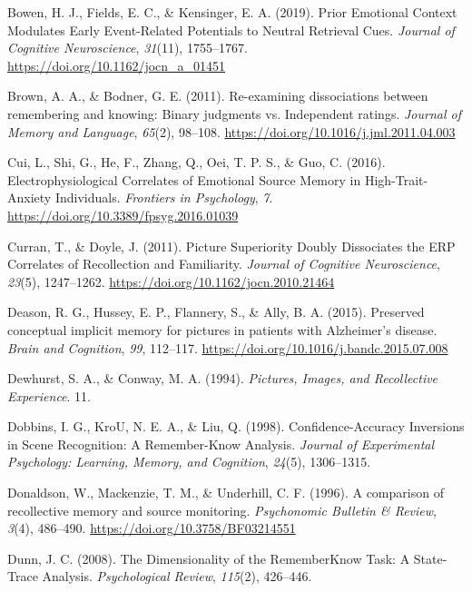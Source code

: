 \documentclass[
  11pt,
]{article}
\begin{document}
\leavevmode\hypertarget{ref-bowen2019}{}%
Bowen, H. J., Fields, E. C., \& Kensinger, E. A. (2019). Prior Emotional
Context Modulates Early Event-Related Potentials to Neutral Retrieval
Cues. \emph{Journal of Cognitive Neuroscience}, \emph{31}(11),
1755--1767. \url{https://doi.org/10.1162/jocn_a_01451}

\leavevmode\hypertarget{ref-brown2011}{}%
Brown, A. A., \& Bodner, G. E. (2011). Re-examining dissociations
between remembering and knowing: Binary judgments vs. Independent
ratings. \emph{Journal of Memory and Language}, \emph{65}(2), 98--108.
\url{https://doi.org/10.1016/j.jml.2011.04.003}

\leavevmode\hypertarget{ref-cui2016}{}%
Cui, L., Shi, G., He, F., Zhang, Q., Oei, T. P. S., \& Guo, C. (2016).
Electrophysiological Correlates of Emotional Source Memory in
High-Trait-Anxiety Individuals. \emph{Frontiers in Psychology},
\emph{7}. \url{https://doi.org/10.3389/fpsyg.2016.01039}

\leavevmode\hypertarget{ref-curran2011}{}%
Curran, T., \& Doyle, J. (2011). Picture Superiority Doubly Dissociates
the ERP Correlates of Recollection and Familiarity. \emph{Journal of
Cognitive Neuroscience}, \emph{23}(5), 1247--1262.
\url{https://doi.org/10.1162/jocn.2010.21464}

\leavevmode\hypertarget{ref-deason2015}{}%
Deason, R. G., Hussey, E. P., Flannery, S., \& Ally, B. A. (2015).
Preserved conceptual implicit memory for pictures in patients with
Alzheimer's disease. \emph{Brain and Cognition}, \emph{99}, 112--117.
\url{https://doi.org/10.1016/j.bandc.2015.07.008}

\leavevmode\hypertarget{ref-dewhurst1994}{}%
Dewhurst, S. A., \& Conway, M. A. (1994). \emph{Pictures, Images, and
Recollective Experience}. 11.

\leavevmode\hypertarget{ref-dobbins1998}{}%
Dobbins, I. G., KroU, N. E. A., \& Liu, Q. (1998). Confidence-Accuracy
Inversions in Scene Recognition: A Remember-Know Analysis. \emph{Journal
of Experimental Psychology: Learning, Memory, and Cognition},
\emph{24}(5), 1306--1315.

\leavevmode\hypertarget{ref-donaldson1996}{}%
Donaldson, W., Mackenzie, T. M., \& Underhill, C. F. (1996). A
comparison of recollective memory and source monitoring.
\emph{Psychonomic Bulletin \& Review}, \emph{3}(4), 486--490.
\url{https://doi.org/10.3758/BF03214551}

\leavevmode\hypertarget{ref-dunn2008}{}%
Dunn, J. C. (2008). The Dimensionality of the RememberKnow Task: A
State-Trace Analysis. \emph{Psychological Review}, \emph{115}(2),
426--446.
\end{document}
